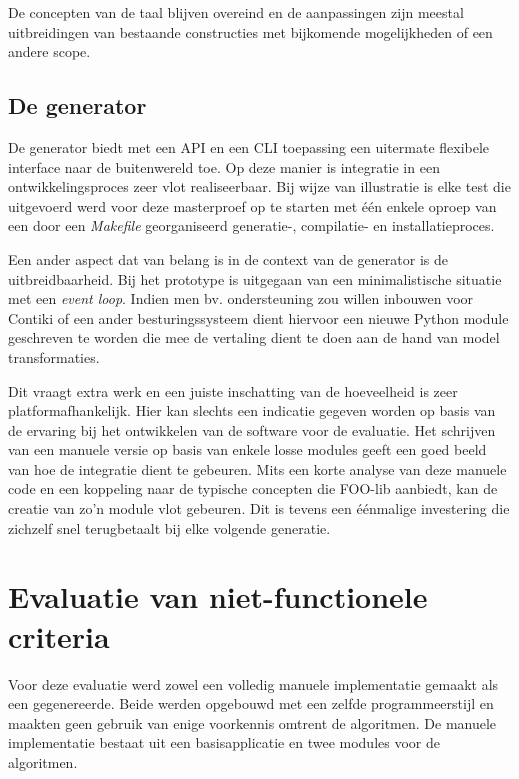 De concepten van de taal blijven overeind en de aanpassingen zijn meestal
uitbreidingen van bestaande constructies met bijkomende mogelijkheden of een
andere scope.

\vspace{-3mm}

\subsection{De generator}

De generator biedt met een API en een CLI toepassing een uitermate flexibele
interface naar de buitenwereld toe. Op deze manier is integratie in een
ontwikkelingsproces zeer vlot realiseerbaar. Bij wijze van illustratie is elke
test die uitgevoerd werd voor deze masterproef op te starten met \'e\'en enkele
oproep van een door een \emph{Makefile} georganiseerd generatie-, compilatie-
en installatieproces.

Een ander aspect dat van belang is in de context van de generator is de
uitbreidbaarheid. Bij het prototype is uitgegaan van een minimalistische
situatie met een \emph{event loop}. Indien men bv. ondersteuning zou willen
inbouwen voor Contiki of een ander besturingssysteem dient hiervoor een nieuwe
Python module geschreven te worden die mee de vertaling dient te doen aan de
hand van model transformaties.

Dit vraagt extra werk en een juiste inschatting van de hoeveelheid is zeer
platformafhankelijk. Hier kan slechts een indicatie gegeven worden op basis van
de ervaring bij het ontwikkelen van de software voor de evaluatie. Het
schrijven van een manuele versie op basis van enkele losse modules geeft een
goed beeld van hoe de integratie dient te gebeuren. Mits een korte analyse van
deze manuele code en een koppeling naar de typische concepten die FOO-lib
aanbiedt, kan de creatie van zo'n module vlot gebeuren. Dit is tevens een
\'e\'enmalige investering die zichzelf snel terugbetaalt bij elke volgende
generatie.

\vspace{-3mm}

\section{Evaluatie van niet-functionele criteria}
\label{section:evaluation-non-functionals}

Voor deze evaluatie werd zowel een volledig manuele implementatie gemaakt als
een gegenereerde. Beide werden opgebouwd met een zelfde programmeerstijl en
maakten geen gebruik van enige voorkennis omtrent de algoritmen. De manuele
implementatie bestaat uit een basisapplicatie en twee modules voor de
algoritmen.

